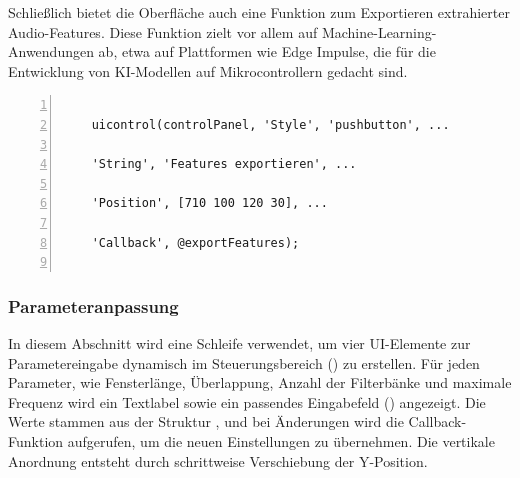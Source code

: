 Schließlich bietet die Oberfläche auch eine Funktion zum Exportieren extrahierter Audio-Features. Diese Funktion zielt vor allem auf Machine-Learning-Anwendungen ab, etwa auf Plattformen wie Edge Impulse, die für die Entwicklung von KI-Modellen auf Mikrocontrollern gedacht sind. \cite{Hossain:2025} \cite{MathWorks:2025ModelCallbacks}

\begin{lstlisting}[frame=single, numbers=left, style=Matlab-Pyglike]
    
    uicontrol(controlPanel, 'Style', 'pushbutton', ...
    
    'String', 'Features exportieren', ...
    
    'Position', [710 100 120 30], ...
    
    'Callback', @exportFeatures);
    
\end{lstlisting}

\subsubsection{Parameteranpassung}

In diesem Abschnitt wird eine Schleife verwendet, um vier UI-Elemente zur Parametereingabe dynamisch im Steuerungsbereich () zu erstellen. Für jeden Parameter, wie Fensterlänge, Überlappung, Anzahl der Filterbänke und maximale Frequenz wird ein Textlabel sowie ein passendes Eingabefeld () angezeigt. Die Werte stammen aus der Struktur , und bei Änderungen wird die Callback-Funktion  aufgerufen, um die neuen Einstellungen zu übernehmen. Die vertikale Anordnung entsteht durch schrittweise Verschiebung der Y-Position. \cite{Hossain:2025}

